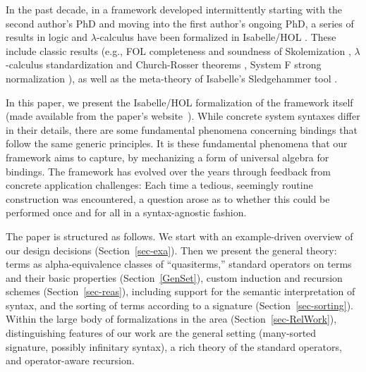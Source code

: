 \documentclass{llncs}
\begin{document}
In the past decade, in a framework developed intermittently 
starting with the second author's PhD \cite{pop-thesis} 
and moving into the first author's ongoing PhD, 
a series of results in logic and $\lambda$-calculus have been formalized in 
Isabelle/HOL \cite{nipkow-et-al-2002,nipkow-klein-2014}.  
These include classic results (e.g., FOL completeness and soundness of 
Skolemization \cite{blanchette-et-al-2014-ijcar,soundCompl-jou,blanchette-frocos2013}, 
$\lambda$-calculus standardization and Church-Rosser theorems \cite{pop-recPrin,pop-thesis}, System F 
strong normalization \cite{pop-HOASOnFOAS}), as well as 
the meta-theory of Isabelle's Sledgehammer 
tool \cite{blanchette-frocos2013,blanchette-et-al-2013-types}.  
 
In this paper, we present the Isabelle/HOL formalization of the framework itself (made available from
the paper's website~\cite{binding-scripts}). 
While concrete system syntaxes %
differ in their %
details, there are some fundamental phenomena 
concerning bindings %
that follow the same generic  
principles. It is these fundamental phenomena that our framework aims to capture, 
by mechanizing a form of universal algebra for bindings. The framework has evolved 
over the years %
through feedback from %
concrete 
application challenges: Each time a tedious, seemingly routine construction was encountered, 
a question arose as to whether this could be performed once and for 
all in a syntax-agnostic fashion. %

The paper is structured as follows. We start with an example-driven overview of our design decisions %
(Section~\ref{sec-exa}). Then we present the general theory: %
terms as alpha-equivalence classes of ``quasiterms,'' standard operators on terms 
and their basic properties (Section~\ref{GenSet}), 
custom induction and recursion schemes (Section~\ref{sec-reas}), 
including support for the semantic interpretation of syntax, and the sorting 
of terms according to a signature (Section~\ref{sec-sorting}). 
%
Within the large body of formalizations in the area (Section~\ref{sec-RelWork}), 
distinguishing features of our work are the general setting (many-sorted signature, possibly infinitary syntax), 
a rich theory of the standard operators, and operator-aware recursion. 
\end{document}
